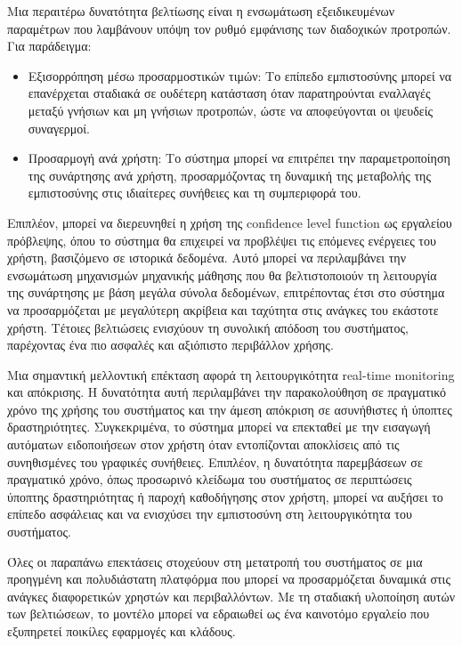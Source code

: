 Μια περαιτέρω δυνατότητα βελτίωσης είναι η ενσωμάτωση εξειδικευμένων παραμέτρων που λαμβάνουν υπόψη τον ρυθμό εμφάνισης των διαδοχικών προτροπών. Για παράδειγμα:
\begin{itemize}
    \item{Εξισορρόπηση μέσω προσαρμοστικών τιμών}: Το επίπεδο εμπιστοσύνης μπορεί να επανέρχεται σταδιακά σε ουδέτερη κατάσταση όταν παρατηρούνται εναλλαγές μεταξύ γνήσιων και μη γνήσιων προτροπών, ώστε να αποφεύγονται οι ψευδείς συναγερμοί.
    \item{Προσαρμογή ανά χρήστη}: Το σύστημα μπορεί να επιτρέπει την παραμετροποίηση της συνάρτησης ανά χρήστη, προσαρμόζοντας τη δυναμική της μεταβολής της εμπιστοσύνης στις ιδιαίτερες συνήθειες και τη συμπεριφορά του.
\end{itemize}

Επιπλέον, μπορεί να διερευνηθεί η χρήση της confidence level function ως εργαλείου πρόβλεψης, όπου το σύστημα θα επιχειρεί να προβλέψει τις επόμενες ενέργειες του χρήστη, βασιζόμενο σε ιστορικά δεδομένα. Αυτό μπορεί να περιλαμβάνει την ενσωμάτωση μηχανισμών μηχανικής μάθησης που θα βελτιστοποιούν τη λειτουργία της συνάρτησης με βάση μεγάλα σύνολα δεδομένων, επιτρέποντας έτσι στο σύστημα να προσαρμόζεται με μεγαλύτερη ακρίβεια και ταχύτητα στις ανάγκες του εκάστοτε χρήστη. Τέτοιες βελτιώσεις ενισχύουν τη συνολική απόδοση του συστήματος, παρέχοντας ένα πιο ασφαλές και αξιόπιστο περιβάλλον χρήσης.

Μια σημαντική μελλοντική επέκταση αφορά τη λειτουργικότητα real-time monitoring και απόκρισης. Η δυνατότητα αυτή περιλαμβάνει την παρακολούθηση σε πραγματικό χρόνο της χρήσης του συστήματος και την άμεση απόκριση σε ασυνήθιστες ή ύποπτες δραστηριότητες. Συγκεκριμένα, το σύστημα μπορεί να επεκταθεί με την εισαγωγή αυτόματων ειδοποιήσεων στον χρήστη όταν εντοπίζονται αποκλίσεις από τις συνηθισμένες του γραφικές συνήθειες. Επιπλέον, η δυνατότητα παρεμβάσεων σε πραγματικό χρόνο, όπως προσωρινό κλείδωμα του συστήματος σε περιπτώσεις ύποπτης δραστηριότητας ή παροχή καθοδήγησης στον χρήστη, μπορεί να αυξήσει το επίπεδο ασφάλειας και να ενισχύσει την εμπιστοσύνη στη λειτουργικότητα του συστήματος.

Όλες οι παραπάνω επεκτάσεις στοχεύουν στη μετατροπή του συστήματος σε μια προηγμένη και πολυδιάστατη πλατφόρμα που μπορεί να προσαρμόζεται δυναμικά στις ανάγκες διαφορετικών χρηστών και περιβαλλόντων. Με τη σταδιακή υλοποίηση αυτών των βελτιώσεων, το μοντέλο μπορεί να εδραιωθεί ως ένα καινοτόμο εργαλείο που εξυπηρετεί ποικίλες εφαρμογές και κλάδους.
